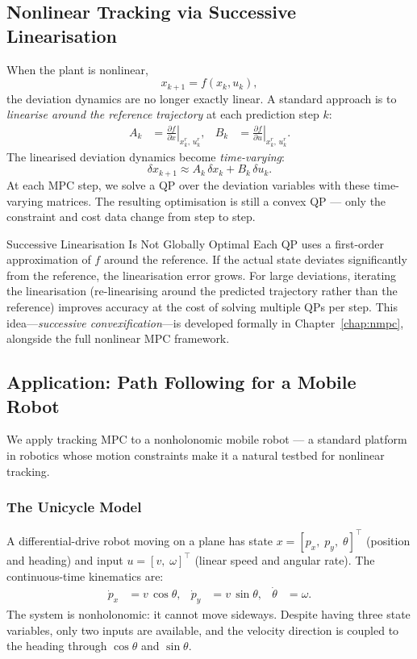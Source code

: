 \subsection{Nonlinear Tracking via Successive Linearisation}

When the plant is nonlinear,
\[
x_{k+1} = f(x_k, u_k),
\]
the deviation dynamics are no longer exactly linear. A standard approach is to \emph{linearise around the reference trajectory} at each prediction step $k$:
\begin{align*}
	A_k &= \left.\frac{\partial f}{\partial x}\right|_{x^r_k,\, u^r_k}, &
	B_k &= \left.\frac{\partial f}{\partial u}\right|_{x^r_k,\, u^r_k}.
\end{align*}
The linearised deviation dynamics become \emph{time-varying}:
\[
\delta x_{k+1} \approx A_k\,\delta x_k + B_k\,\delta u_k.
\]
At each MPC step, we solve a QP over the deviation variables with these time-varying matrices. The resulting optimisation is still a convex QP --- only the constraint and cost data change from step to step.

\begin{alertbox}{Successive Linearisation Is Not Globally Optimal}
	Each QP uses a first-order approximation of $f$ around the reference. If the actual state deviates significantly from the reference, the linearisation error grows. For large deviations, iterating the linearisation (re-linearising around the predicted trajectory rather than the reference) improves accuracy at the cost of solving multiple QPs per step. This idea---\emph{successive convexification}---is developed formally in Chapter~\ref{chap:nmpc}, alongside the full nonlinear MPC framework.
\end{alertbox}

\subsection{Application: Path Following for a Mobile Robot}

We apply tracking MPC to a nonholonomic mobile robot --- a standard platform in robotics whose motion constraints make it a natural testbed for nonlinear tracking.

\subsubsection*{The Unicycle Model}

A differential-drive robot moving on a plane has state $x = [p_x,\; p_y,\; \theta]^\top$ (position and heading) and input $u = [v,\; \omega]^\top$ (linear speed and angular rate). The continuous-time kinematics are:
\begin{align*}
	\dot{p}_x &= v\,\cos\theta, &
	\dot{p}_y &= v\,\sin\theta, &
	\dot{\theta} &= \omega.
\end{align*}
The system is nonholonomic: it cannot move sideways. Despite having three state variables, only two inputs are available, and the velocity direction is coupled to the heading through $\cos\theta$ and $\sin\theta$.

